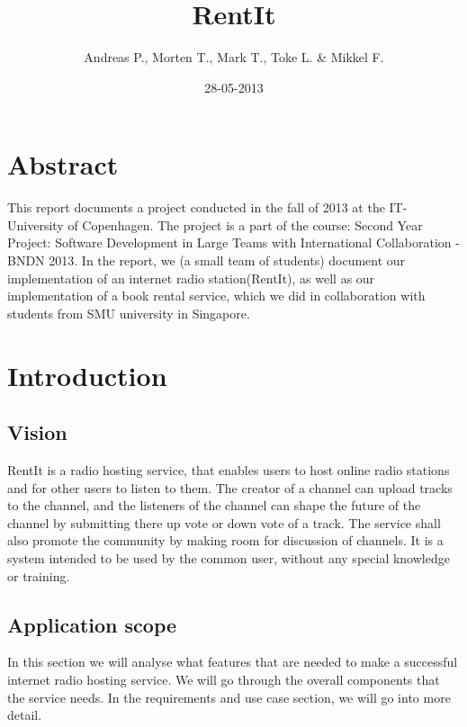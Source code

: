 \documentclass[a4paper,11pt,report]{article}
\begin{document}
\title{RentIt}
\author{Andreas P., Morten T., Mark T., Toke L. \& Mikkel F.}
\date{28-05-2013}
\maketitle

\section*{Abstract}
{
This report documents a project conducted in the fall of 2013 at the IT-University of Copenhagen. The project is a part of the course: Second Year Project: Software Development in Large Teams with International Collaboration - BNDN 2013. In the report, we (a small team of students) document our implementation of an internet radio station(RentIt), as well as our implementation of a book rental service, which we did in collaboration with students from SMU university in Singapore.\\ 
\newpage

\tableofcontents

\section{Introduction}
\subsection{Vision}
RentIt is a radio hosting service, that enables users to host online radio stations and for other users to listen to them. The creator of a channel can upload tracks to the channel, and the listeners of the channel can shape the future of the channel by submitting there up vote or down vote of a track. The service shall also promote the community by making room for discussion of channels.
It is a system intended to be used by the common user, without any special knowledge or training.

\subsection{Application scope}
In this section we will analyse what features that are needed to make a successful internet radio hosting service. We will go through the overall components that the service needs. In the requirements and use case section, we will go into more detail.

}
\end{document}
